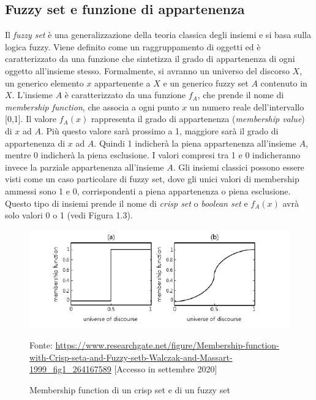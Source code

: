 \documentclass[11pt,  oneside, openany]{book}
\newcommand{\source}[1]{\caption*{Fonte: {#1}} }
\begin{document}
\subsection{Fuzzy set e funzione di appartenenza}
Il \textit{fuzzy set} è una generalizzazione della teoria classica degli insiemi e si basa sulla logica fuzzy. Viene definito come un raggruppamento di oggetti ed è caratterizzato da una funzione che sintetizza il grado di appartenenza di ogni oggetto all'insieme stesso. Formalmente, si avranno un universo del discorso $X$, un generico elemento $x$  appartenente a $X$ e un generico fuzzy set $A$ contenuto in $X$. L'insieme $A$ è caratterizzato da una funzione $f_A$, che prende il nome di \textit{membership function}, che associa a ogni punto $x$ un numero reale dell'intervallo [0,1]. Il valore $f_A(x)$ rappresenta il grado di appartenenza (\textit {membership value}) di $x$ ad $A$. Più questo valore sarà prossimo a 1, maggiore sarà il grado di appartenenza di $x$ ad $A$. Quindi 1 indicherà la piena appartenenza all'insieme $A$, mentre 0 indicherà la piena esclusione. I valori compresi tra 1 e 0 indicheranno invece la parziale appartenenza all'insieme $A$. Gli insiemi classici possono essere visti come un caso particolare di fuzzy set, dove gli unici valori di membership ammessi sono 1 e 0, corrispondenti a piena appartenenza o piena esclusione. Questo tipo di insiemi prende il nome di \textit{crisp set} o \textit{boolean set} e $f_A(x)$ avrà solo valori 0 o 1 (vedi Figura 1.3). 


\begin{figure}[h!]
\begin{center}
  \includegraphics[width=13cm]{Immagini/membfunctcrispvsfuzzy.png}\\
  \caption{Membership function di un crisp set e di un fuzzy set}
  \source{\url{https://www.researchgate.net/figure/Membership-function-with-Crisp-seta-and-Fuzzy-setb-Walczak-and-Massart-1999_fig1_264167589} [Accesso in settembre 2020]}
\end{center}
\end{figure}
\end{document}
